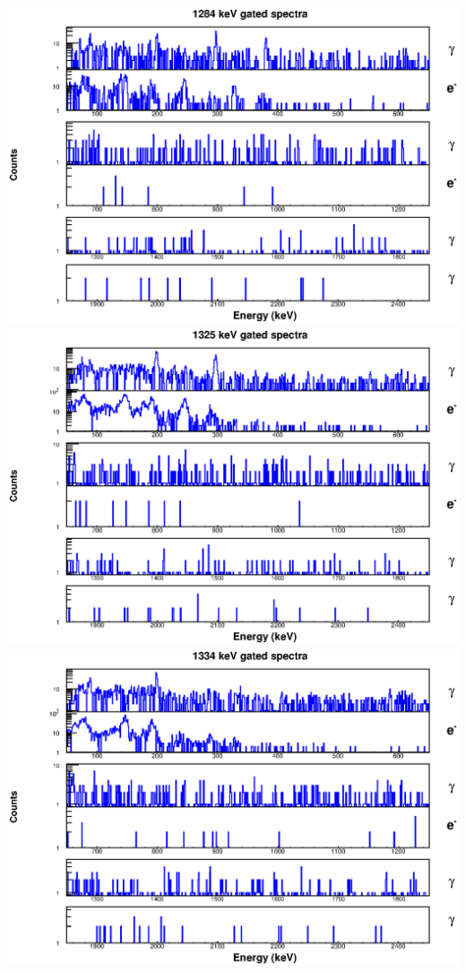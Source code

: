 \includegraphics[scale=0.8]{156Gd_Appendix/1284_combined.eps}
\includegraphics[scale=0.8]{156Gd_Appendix/1325_combined.eps}
\includegraphics[scale=0.8]{156Gd_Appendix/1334_combined.eps}
